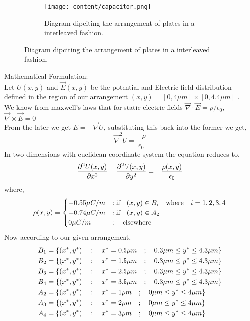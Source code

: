 \begin{figure}[h]
    \centering
    \begin{subfigure}[b]{\linewidth}
    \texttt{[image: content/capacitor.png]}
    \caption{\small Diagram dipciting the arrangement of plates in a interleaved fashion.}
    \label{fig 1: the capacitor}
    \end{subfigure}
\end{figure}
Mathematical Formulation:\\
Let $U(x,y)$ and $\vec{E}(x,y)$ be the potential and Electric field distribution defined in the region of our arrangement $(x,y) = [0,4\mu m]\times[0,4.4\mu m]$ .\\
We know from maxwell's laws that for static electric fields $\vec{\nabla} \cdot \vec{E} = \rho / \epsilon_0 $, $\vec{\nabla} \times \vec{E} = 0$
\\
From the later we get $E=-\vec{\nabla}U$, substituting this back into the former we get,
\begin{equation*}
    \vec{\nabla}^2 U = \frac{-\rho}{\epsilon_0}  
\end{equation*}
In two dimensions with euclidean coordinate system the equation reduces to, 
\begin{equation}
    \frac{\partial^2U(x,y) }{\partial x^{2}} + \frac{\partial^2U(x,y) }{\partial y^{2}}= -\frac{\rho(x,y)}{\epsilon_0} \\
\end{equation}
where,
\begin{equation}
\rho(x,y) =  \begin{cases}
    -0.55 \mu C/m & :\text{if} \hspace{0.35cm} (x,y) \in B_i \hspace{0.35cm} \text{where} \hspace{0.35cm} i = 1,2,3,4 \\
    +0.74 \mu C/m & :\text{if} \hspace{0.35cm} (x,y) \in A_2  \\
    0 \mu C/m & : \hspace{0.35cm} \text{elsewhere} \\
\end{cases}  
\end{equation}
Now according to our given arrangement,
\begin{align}
    B_1 &= \{ (x^*,y^*) \hspace{0.35cm} : \hspace{0.35cm} x^*= 0.5\mu m \hspace{0.35cm};\hspace{0.35cm} 0.3\mu m \leq y^* \leq 4.3\mu m \} \\
    B_2 &= \{ (x^*,y^*) \hspace{0.35cm} : \hspace{0.35cm} x^*= 1.5\mu m \hspace{0.35cm};\hspace{0.35cm} 0.3\mu m \leq y^* \leq 4.3\mu m \} \\
    B_3 &= \{ (x^*,y^*) \hspace{0.35cm} : \hspace{0.35cm} x^*= 2.5\mu m \hspace{0.35cm};\hspace{0.35cm} 0.3\mu m \leq y^* \leq 4.3\mu m \} \\
    B_4 &= \{ (x^*,y^*) \hspace{0.35cm} : \hspace{0.35cm} x^*= 3.5\mu m \hspace{0.35cm};\hspace{0.35cm} 0.3\mu m \leq y^* \leq 4.3\mu m \} \\
    A_2 &= \{ (x^*,y^*) \hspace{0.35cm} : \hspace{0.35cm} x^*= 1\mu m \hspace{0.35cm};\hspace{0.35cm} 0\mu m \leq y^* \leq 4\mu m \} \\
    A_3 &= \{ (x^*,y^*) \hspace{0.35cm} : \hspace{0.35cm} x^*= 2\mu m \hspace{0.35cm};\hspace{0.35cm} 0\mu m \leq y^* \leq 4\mu m \} \\
    A_4 &= \{ (x^*,y^*) \hspace{0.35cm} : \hspace{0.35cm} x^*= 3\mu m \hspace{0.35cm};\hspace{0.35cm} 0\mu m \leq y^* \leq 4\mu m \} 
\end{align}
